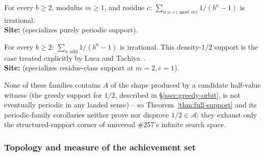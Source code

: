 \begin{thm}
For every $b \ge 2$, modulus $m \ge 1$, and residue $c$: $\sum_{n \equiv c \pmod m} 1/(b^n-1)$ is
irrational.   \\
\textbf{Site:} 
(specializes purely periodic support).
\end{thm}

\begin{thm}
For every $b \ge 2$: $\sum_{n \text{ odd}} 1/(b^n-1)$ is irrational. This density-$1/2$ support is
the case treated explicitly by Luca and Tachiya~\cite[Example~2, p.~140]{lucatachiya2017}.
  \\
\textbf{Site:} 
(specializes residue-class support at $m=2,c=1$).
\end{thm}

None of these families contains $A$ of the shape produced by a candidate half-value witness (the
greedy support for $1/2$, described in \S\ref{ssec:greedy-orbit}, is not eventually periodic in any
landed sense) -- so Theorem~\ref{thm:full-support} and its periodic-family corollaries neither prove
nor disprove $1/2 \in \mathcal{A}$; they exhaust only the structured-support corner of universal
\#257's infinite search space.

\subsubsection{Topology and measure of the achievement set}

